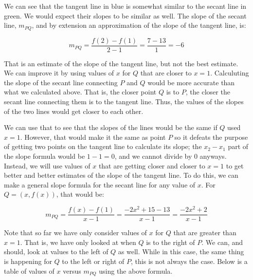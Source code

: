 \documentclass[12pt]{article}
\theoremstyle{definition}
\begin{document}
We can see that the tangent line in blue is somewhat similar to the secant line in green.
We would expect their slopes to be similar as well.
The slope of the secant line, $m_{PQ}$, and by extension an approximation of the slope of the tangent line, is:

\begin{equation*}
    m_{PQ} = \frac{f(2)-f(1)}{2-1} = \frac{7-13}{1} = -6
\end{equation*}

That is an estimate of the slope of the tangent line, but not the best estimate.
We can improve it by using values of $x$ for $Q$ that are closer to $x=1$.
Calculuting the slope of the secant line connecting $P$ and $Q$ would be more accurate than what we calculated above.
That is, the closer point $Q$ is to $P$, the closer the secant line connecting them is to the tangent line.
Thus, the values of the slopes of the two lines would get closer to each other.

We can use that to see that the slopes of the lines would be the same if $Q$ used $x=1$.
However, that would make it the same as point $P$ so it defeats the purpose of getting two points on the tangent line to calculate its slope; the $x_2-x_1$ part of the slope formula would be $1-1=0$, and we cannot divide by 0 anyways.
Instead, we will use values of $x$ that are getting closer and closer to $x=1$ to get better and better estimates of the slope of the tangent line.
To do this, we can make a general slope formula for the secant line for any value of $x$.
For $Q=(x, f(x))$, that would be:

\begin{equation}
    m_{PQ} = \frac{f(x)-f(1)}{x-1} = \frac{-2x^2 + 15 - 13}{x-1} = \frac{-2x^2+2}{x-1}
\end{equation}

Note that so far we have only consider values of $x$ for $Q$ that are greater than $x=1$.
That is, we have only looked at when $Q$ is to the right of $P$.
We can, and should, look at values to the left of $Q$ as well.
While in this case, the same thing is happening for $Q$ to the left or right of $P$, this is not always the case.
Below is a table of values of $x$ versus $m_{PQ}$ using the above formula.
\end{document}
